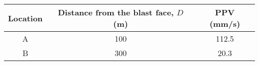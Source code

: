 \begin{center}
  \label{tab:q61-ppv}
  \begin{tabular}{|c|c|c|}
    \hline
    \textbf{Location} & \textbf{Distance from the blast face, $D$ (m)} & \textbf{PPV (mm/s)} \\ \hline
    A & 100 & 112.5 \\ \hline
    B & 300 & 20.3 \\ \hline
  \end{tabular}
\end{center}
